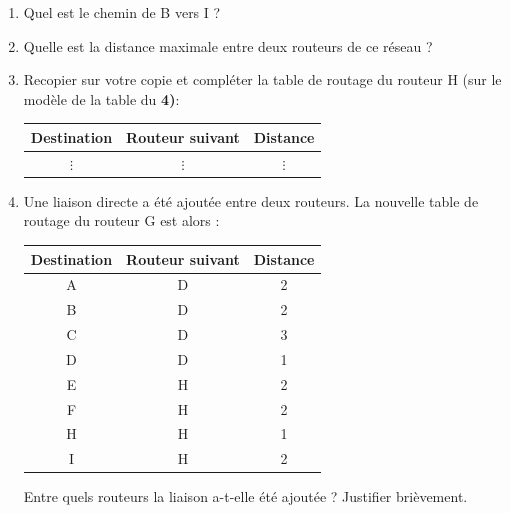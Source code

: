 \documentclass[11pt,a4paper,french,twoside]{PMCours}
\begin{document}
\begin{enumerate}
    \item Quel est le chemin de B vers I ?
    \item Quelle est la distance maximale entre deux routeurs de ce réseau ? 
    \item Recopier sur votre copie et compléter la table de routage du routeur H (sur le modèle de la table du {\bf 4)}:
    \begin{center}
        \begin{tabular}{|c|c|c|}\hline
            Destination&Routeur suivant&Distance\\ \hline
            $\vdots$ &$\vdots$&$\vdots$\\ \hline
            
        \end{tabular}
    \end{center}
    \item Une liaison directe a été ajoutée entre deux routeurs.
    La nouvelle table de routage du routeur G est alors :
    \begin{center}
        \begin{tabular}{|c|c|c|}\hline
            Destination&Routeur suivant&Distance\\ \hline
            A&D &2 \\ \hline 
            B&D &2 \\ \hline 
            C&D &3 \\ \hline 
            D&D &1 \\ \hline 
            E&H &2 \\ \hline 
            F&H &2 \\ \hline  
            H&H &1 \\ \hline
            I&H &2 \\ \hline
 \end{tabular}
    \end{center}
    Entre quels routeurs la liaison a-t-elle été ajoutée ? Justifier brièvement.
\end{enumerate}

\newpage
\end{document}
